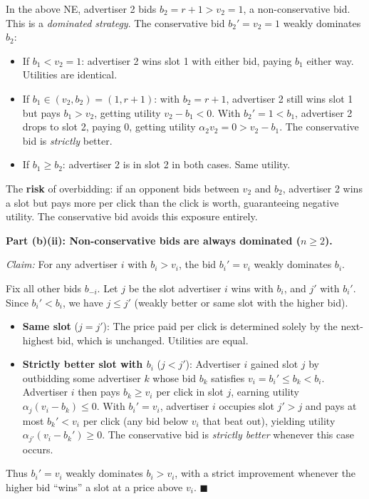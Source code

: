 \documentclass{article}
\begin{document}
\medskip
In the above NE, advertiser 2 bids $b_2 = r + 1 > v_2 = 1$, a non-conservative bid. This is a \emph{dominated strategy}. The conservative bid $b_2' = v_2 = 1$ weakly dominates $b_2$:
\begin{itemize}
    \item If $b_1 < v_2 = 1$: advertiser 2 wins slot 1 with either bid, paying $b_1$ either way. Utilities are identical.
    \item If $b_1 \in (v_2, b_2) = (1, r+1)$: with $b_2 = r+1$, advertiser 2 still wins slot 1 but pays $b_1 > v_2$, getting utility $v_2 - b_1 < 0$. With $b_2' = 1 < b_1$, advertiser 2 drops to slot 2, paying 0, getting utility $\alpha_2 v_2 = 0 > v_2 - b_1$. The conservative bid is \emph{strictly} better.
    \item If $b_1 \geq b_2$: advertiser 2 is in slot 2 in both cases. Same utility.
\end{itemize}
The \textbf{risk} of overbidding: if an opponent bids between $v_2$ and $b_2$, advertiser 2 wins a slot but pays more per click than the click is worth, guaranteeing negative utility. The conservative bid avoids this exposure entirely.

\medskip
\noindent\textbf{Part (b)(ii): Non-conservative bids are always dominated ($n \geq 2$).}

\medskip
\noindent\textit{Claim:} For any advertiser $i$ with $b_i > v_i$, the bid $b_i' = v_i$ weakly dominates $b_i$.

Fix all other bids $b_{-i}$. Let $j$ be the slot advertiser $i$ wins with $b_i$, and $j'$ with $b_i'$. Since $b_i' < b_i$, we have $j \leq j'$ (weakly better or same slot with the higher bid).

\begin{itemize}
    \item \textbf{Same slot} ($j = j' $): The price paid per click is determined solely by the next-highest bid, which is unchanged. Utilities are equal.
    \item \textbf{Strictly better slot with $b_i$} ($j < j'$): Advertiser $i$ gained slot $j$ by outbidding some advertiser $k$ whose bid $b_k$ satisfies $v_i = b_i' \leq b_k < b_i$. Advertiser $i$ then pays $b_k \geq v_i$ per click in slot $j$, earning utility $\alpha_j(v_i - b_k) \leq 0$. With $b_i' = v_i$, advertiser $i$ occupies slot $j' > j$ and pays at most $b_k' < v_i$ per click (any bid below $v_i$ that beat out), yielding utility $\alpha_{j'}(v_i - b_k') \geq 0$. The conservative bid is \emph{strictly better} whenever this case occurs.
\end{itemize}
Thus $b_i' = v_i$ weakly dominates $b_i > v_i$, with a strict improvement whenever the higher bid ``wins'' a slot at a price above $v_i$. $\blacksquare$
\end{document}
